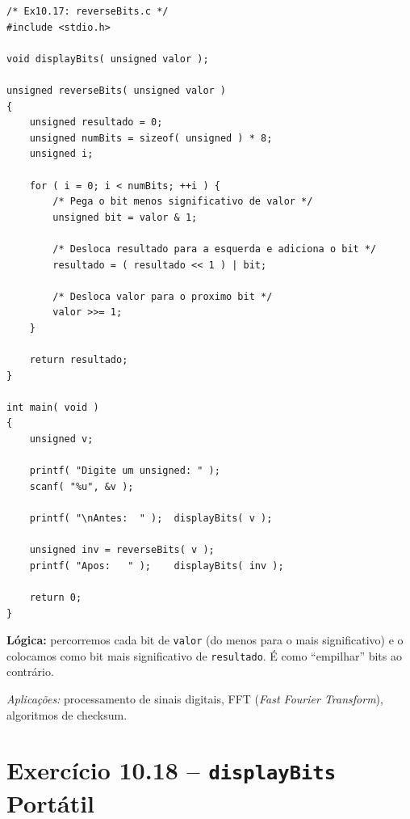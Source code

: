 \documentclass[12pt,a4paper]{article}
\begin{document}
\begin{respostabox}
\begin{lstlisting}
/* Ex10.17: reverseBits.c */
#include <stdio.h>

void displayBits( unsigned valor );

unsigned reverseBits( unsigned valor )
{
    unsigned resultado = 0;
    unsigned numBits = sizeof( unsigned ) * 8;
    unsigned i;

    for ( i = 0; i < numBits; ++i ) {
        /* Pega o bit menos significativo de valor */
        unsigned bit = valor & 1;

        /* Desloca resultado para a esquerda e adiciona o bit */
        resultado = ( resultado << 1 ) | bit;

        /* Desloca valor para o proximo bit */
        valor >>= 1;
    }

    return resultado;
}

int main( void )
{
    unsigned v;

    printf( "Digite um unsigned: " );
    scanf( "%u", &v );

    printf( "\nAntes:  " );  displayBits( v );

    unsigned inv = reverseBits( v );
    printf( "Apos:   " );    displayBits( inv );

    return 0;
}
\end{lstlisting}

\textbf{Lógica:} percorremos cada bit de \texttt{valor} (do menos para o mais
significativo) e o colocamos como bit mais significativo de \texttt{resultado}.
É como ``empilhar'' bits ao contrário.

\textit{Aplicações:} processamento de sinais digitais, FFT
(\textit{Fast Fourier Transform}), algoritmos de checksum.
\end{respostabox}

\newpage

\section{Exercício 10.18 -- \texttt{displayBits} Portátil}
\end{document}
